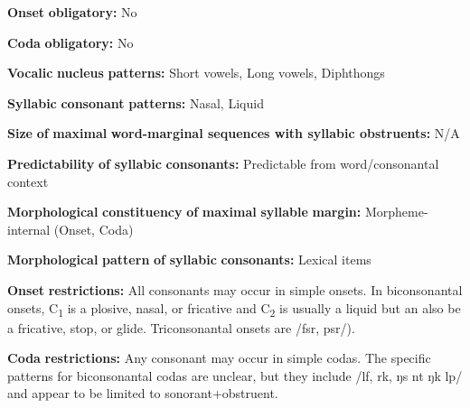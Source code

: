 \documentclass[output=paper]{langsci/langscibook}
\begin{document}
\begin{styleBody}
\textbf{Onset} \textbf{obligatory:} No
\end{styleBody}

\begin{styleBody}
\textbf{Coda} \textbf{obligatory:} No
\end{styleBody}

\begin{styleBody}
\textbf{Vocalic} \textbf{nucleus} \textbf{patterns:} Short vowels, Long vowels, Diphthongs
\end{styleBody}

\begin{styleBody}
\textbf{Syllabic} \textbf{consonant} \textbf{patterns:} Nasal, Liquid
\end{styleBody}

\begin{styleBody}
\textbf{Size} \textbf{of} \textbf{maximal} \textbf{word{}-marginal sequences with syllabic obstruents:} N/A
\end{styleBody}

\begin{styleBody}
\textbf{Predictability} \textbf{of} \textbf{syllabic} \textbf{consonants:} Predictable from word/consonantal context
\end{styleBody}

\begin{styleBody}
\textbf{Morphological} \textbf{constituency} \textbf{of} \textbf{maximal} \textbf{syllable} \textbf{margin:} Morpheme-internal (Onset, Coda)
\end{styleBody}

\begin{styleBody}
\textbf{Morphological} \textbf{pattern} \textbf{of} \textbf{syllabic} \textbf{consonants:} Lexical items
\end{styleBody}

\begin{styleBody}
\textbf{Onset} \textbf{restrictions:} All consonants may occur in simple onsets. In biconsonantal onsets, C\textsubscript{1} is a plosive, nasal, or fricative and C\textsubscript{2} is usually a liquid but an also be a fricative, stop, or glide. Triconsonantal onsets are /fsr, psr/).
\end{styleBody}

\begin{styleBody}
\textbf{Coda} \textbf{restrictions:} Any consonant may occur in simple codas. The specific patterns for biconsonantal codas are unclear, but they include /lf, rk, ŋs nt ŋk lp/ and appear to be limited to sonorant+obstruent.
\end{styleBody}
\end{document}

